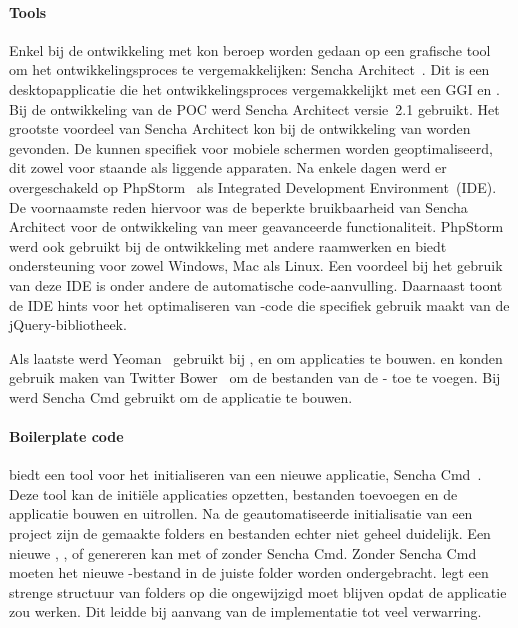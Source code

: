 \paragraph{Tools}
Enkel bij de ontwikkeling met \st{} kon beroep worden gedaan op een grafische tool om het ontwikkelingsproces te vergemakkelijken:  Sencha Architect~\cite{Sencha2012a}.
Dit is een desktopapplicatie die het ontwikkelingsproces vergemakkelijkt met een GGI en .  
Bij de ontwikkeling van de POC werd Sencha Architect versie~2.1 gebruikt.
Het grootste voordeel van Sencha Architect kon bij de ontwikkeling van  worden gevonden.
De  kunnen specifiek voor mobiele schermen worden geoptimaliseerd, dit zowel voor staande als liggende apparaten.
Na enkele dagen werd er overgeschakeld op PhpStorm~\cite{JetBrains2012} als Integrated Development Environment~(IDE).
De voornaamste reden hiervoor was de beperkte bruikbaarheid van Sencha Architect voor de ontwikkeling van meer geavanceerde functionaliteit.
PhpStorm werd ook gebruikt bij de ontwikkeling met andere raamwerken en biedt ondersteuning voor zowel Windows, Mac als Linux.
Een voordeel bij het gebruik van deze IDE is onder andere de automatische code-aanvulling.
Daarnaast toont de IDE hints voor het optimaliseren van \js{}-code die specifiek gebruik maakt van de jQuery-bibliotheek.

Als laatste werd Yeoman~\cite{Yeoman2013} gebruikt bij \kendo{}, \jqm{} en \lungo{} om applicaties te bouwen.
\kendo{} en \lungo{} konden gebruik maken van Twitter Bower~\cite{Twitter2013} om de bestanden van de \gh{}- toe te voegen.
Bij \st{} werd Sencha Cmd gebruikt om de applicatie te bouwen.

\paragraph{Boilerplate code}
\st{} biedt een tool voor het initialiseren van een nieuwe applicatie,  Sencha Cmd~\cite{Sencha2012}.
Deze tool kan de initiële applicaties opzetten,  bestanden toevoegen en de applicatie bouwen en uitrollen.
Na de geautomatiseerde initialisatie van een project zijn de gemaakte folders en bestanden echter niet geheel duidelijk.
Een nieuwe ,  ,   of  genereren kan met of zonder Sencha Cmd.
Zonder Sencha Cmd moeten het nieuwe \js-bestand in de juiste folder worden ondergebracht.
\st{} legt een strenge structuur van folders op die ongewijzigd moet blijven opdat de applicatie zou werken.
Dit leidde bij aanvang van de implementatie tot veel verwarring.

